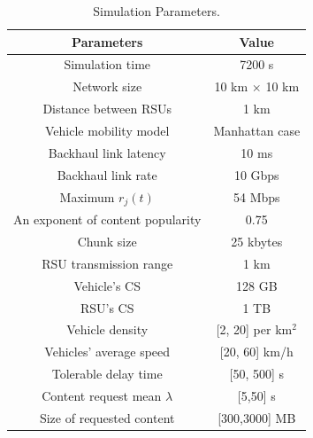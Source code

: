 \documentclass[journal]{IEEEtran}
\begin{document}
\begin{table} %
    \caption{Simulation Parameters.}
    \begin{tabular}{cc}
        \hline
        \textbf{Parameters} & \textbf{Value} \\
        \hline
        Simulation time & 7200 s\\
        Network size & 10 km $\times$ 10 km\\
        Distance between RSUs & 1 km\\
        Vehicle mobility model & Manhattan case \\
        
        Backhaul link latency & 10 ms\\
        Backhaul link rate & 10 Gbps\\
        Maximum $r_{j}(t)$ & 54 Mbps\\
        
        An exponent of content popularity & 0.75\\
        Chunk size & 25 kbytes\\
        
        RSU transmission range & 1 km\\
        
        Vehicle's CS & 128 GB\\
        RSU's CS & 1 TB\\

        Vehicle density & [2, 20] per {km}$^{2}$\\
        Vehicles' average speed & [20, 60] km/h\\
        Tolerable delay time & [50, 500] s\\
        Content request mean $\lambda$ & [5,50] s\\
        Size of requested content & [300,3000] MB \\
        \hline
    \end{tabular}
    \label{table1}
\end{table}
\end{document}
